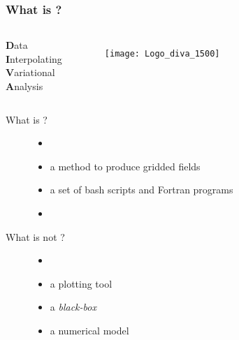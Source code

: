 \begin{frame}
\frametitle{What is \diva?}

\begin{columns}[totalwidth=\textwidth]
\textbf{D}ata\\
\textbf{I}nterpolating\\
\textbf{V}ariational\\
\textbf{A}nalysis
\begin{figure}[H]
\centering
\texttt{[image: Logo\_diva\_1500]}
\end{figure}
\end{columns}

\vspace*{.5cm}

\begin{description}
\item[What is \diva?]
\begin{itemize}
\footnotesize
\item[]
\item a method to produce gridded fields
\item a set of bash scripts and Fortran programs
\item[]
\end{itemize}

\item[What is not \diva?]

\begin{itemize}
\footnotesize
\item[]
\item a plotting tool 
\item a \textit{black-box}
\item a numerical model
\end{itemize}

\end{description}
\end{frame}

